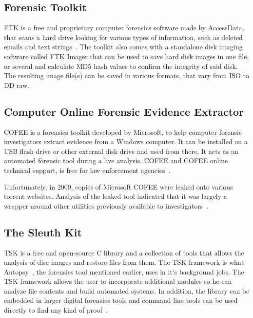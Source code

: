 \subsection{Forensic Toolkit}

\acf{FTK} is a free and proprietary computer forensics software made by AccessData, that scans a hard drive looking for various types of information, such as deleted emails and text strings~\cite{dixon2005overview}. The toolkit also comes with a standalone disk imaging software called FTK Imager that can be used to save hard disk images in one file, or several and calculate MD5 hash values to confirm the integrity of said disk. The resulting image file(s) can be saved in various formats, that vary from ISO to DD raw.

\subsection{Computer Online Forensic Evidence Extractor}

\acf{COFEE} is a forensics toolkit developed by Microsoft, to help computer forensic investigators extract evidence from a Windows computer. It can be installed on a USB flash drive or other external disk drive and used from there. It acts as an automated forensic tool during a live analysis. \ac{COFEE} and \ac{COFEE} online technical support, is free for law enforcement agencies~\cite{microsoft2008cofee}.

Unfortunately, in 2009, copies of Microsoft \ac{COFEE} were leaked onto various torrent websites. Analysis of the leaked tool indicated that it was largely a wrapper around other utilities previously available to investigators~\cite{cofee2009leaked}.

\subsection{The Sleuth Kit}

\acf{TSK} is a free and open-source C library and a collection of tools that allows the analysis of disc images and restore files from them. The \ac{TSK} framework is what Autopsy~\cite{Autopsy}, the forensics tool mentioned earlier, uses in it's background jobs. The \ac{TSK} framework allows the user to incorporate additional modules so he can analyze file contents and build automated systems. In addition, the library can be embedded in larger digital forensics tools and command line tools can be used directly to find any kind of proof~\cite{tsk}. 

